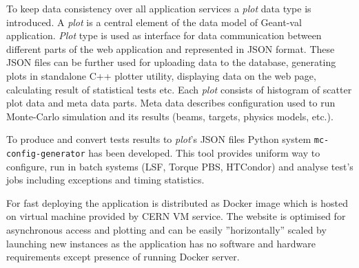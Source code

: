 To keep data consistency over all application services a \textit{plot} data type is introduced. A \textit{plot} is a central element of the data model of \textsf{Geant-val} application.
\textit{Plot} type is used as interface for data communication between different parts of the web application and represented in JSON format. These JSON files can be further used for uploading data to the database, generating plots in standalone C++ plotter utility, displaying data on the web page, calculating result of statistical tests etc.
Each \textit{plot} consists of histogram of scatter plot data and meta data parts. Meta data describes configuration used to run Monte-Carlo simulation and its results (beams, targets, physics models, etc.).

To produce and convert tests results to \textit{plot}'s JSON files Python system {\tt mc-config-generator} has been developed. This tool provides uniform way to configure, run in batch systems (LSF, Torque PBS, HTCondor) and analyse test's jobs including exceptions and timing statistics.

For fast deploying  the application is distributed as Docker image which is hosted on virtual machine provided by CERN VM service. The website is optimised for asynchronous access and plotting and can be easily ''horizontally'' scaled by launching new instances as the application has no software and hardware requirements except presence of running Docker server.